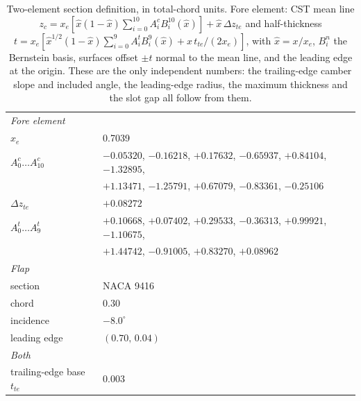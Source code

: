 \begin{table}[tp]
  \centering\footnotesize
  \setlength{\tabcolsep}{4pt}
  \caption{Two-element section definition, in total-chord units. Fore
  element: CST mean line
  $z_c=x_e[\hat x(1-\hat x)\sum_{i=0}^{10}A^{c}_iB^{10}_i(\hat x)]
  +\hat x\,\Delta z_{te}$ and half-thickness
  $t=x_e[\hat x^{1/2}(1-\hat x)\sum_{i=0}^{9}A^{t}_iB^{9}_i(\hat x)
  +\hat x\,t_{te}/(2x_e)]$, with $\hat x=x/x_e$, $B^{n}_i$ the Bernstein
  basis, surfaces offset $\pm t$ normal to the mean line, and the leading
  edge at the origin. These are the only independent numbers: the
  trailing-edge camber slope and included angle, the leading-edge radius,
  the maximum thickness and the slot gap all follow from them.}
  \label{tab:twoelementgeom}
  \begin{tabular}{ll}
    \toprule
    \multicolumn{2}{l}{\emph{Fore element}}\\
    $x_e$ & 0.7039 \\
    $A^{c}_0\ldots A^{c}_{10}$ &
      $-0.05320$, $-0.16218$, $+0.17632$, $-0.65937$, $+0.84104$, $-1.32895$, \\
    & $+1.13471$, $-1.25791$, $+0.67079$, $-0.83361$, $-0.25106$ \\
    $\Delta z_{te}$ & $+0.08272$ \\
    $A^{t}_0\ldots A^{t}_{9}$ &
      $+0.10668$, $+0.07402$, $+0.29533$, $-0.36313$, $+0.99921$, $-1.10675$, \\
    & $+1.44742$, $-0.91005$, $+0.83270$, $+0.08962$ \\
    \midrule
    \multicolumn{2}{l}{\emph{Flap}}\\
    section & NACA 9416 \\
    chord & 0.30 \\
    incidence & $-8.0^\circ$ \\
    leading edge & $(0.70,\,0.04)$ \\
    \midrule
    \multicolumn{2}{l}{\emph{Both}}\\
    trailing-edge base $t_{te}$ & 0.003 \\
    \bottomrule
  \end{tabular}
\end{table}
